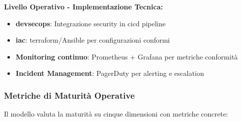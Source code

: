 \textbf{Livello Operativo - Implementazione Tecnica:}
\begin{itemize}
    \item \textbf{\gls{devsecops}}: Integrazione security in \gls{cicd} pipeline
    \item \textbf{\gls{iac}}: \gls{terraform}/Ansible per configurazioni conformi
    \item \textbf{Monitoring continuo}: Prometheus + Grafana per metriche conformità
    \item \textbf{Incident Management}: PagerDuty per alerting e escalation
\end{itemize}

\subsubsection{Metriche di Maturità Operative}

Il modello valuta la maturità su cinque dimensioni con metriche concrete:


